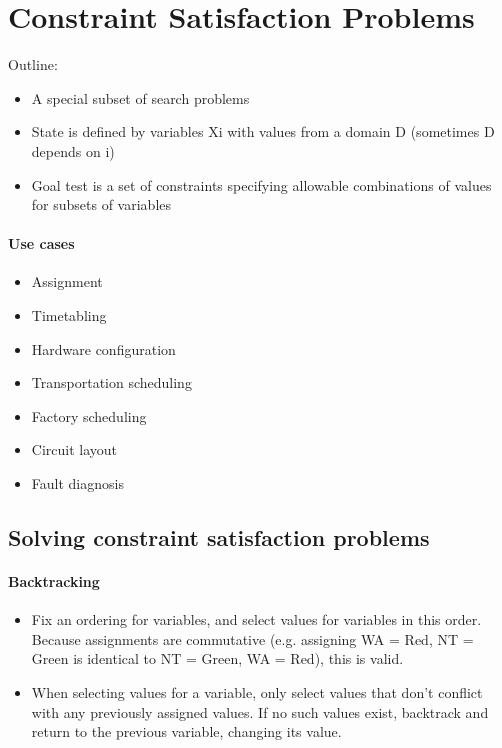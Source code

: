 \section{Constraint Satisfaction Problems}

Outline:
\begin{itemize}
    \item A special subset of search problems
    \item State is defined by variables Xi with values from a domain D (sometimes D depends on i)
    \item Goal test is a set of constraints specifying allowable combinations of values for subsets of variables
\end{itemize}

\paragraph{Use cases}
\begin{itemize}
    \item Assignment
    \item Timetabling
    \item Hardware configuration
    \item Transportation scheduling
    \item Factory scheduling
    \item Circuit layout
    \item Fault diagnosis
\end{itemize}

\subsection{Solving constraint satisfaction problems}

\paragraph{Backtracking}

\begin{itemize}
    \item Fix an ordering for variables, and select values for variables in this order. Because assignments are commutative (e.g. assigning WA = Red, NT = Green is identical to NT = Green, WA = Red), this is valid.
    \item When selecting values for a variable, only select values that don’t conflict with any previously assigned values. If no such values exist, backtrack and return to the previous variable, changing its value.
\end{itemize}

